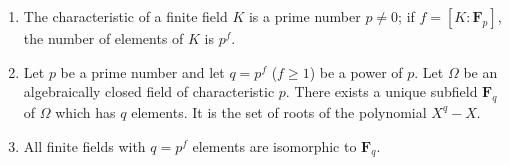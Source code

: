 \begin{enumerate}
\item[(i)] The characteristic of a finite field $K$ is a prime number $p \neq 0$; if $f = [K : \mathbf{F}_p]$, the number of elements of $K$ is $p^f$.
\item[(ii)] Let $p$ be a prime number and let $q = p^f$ ($f \geq 1$) be a power of $p$. Let $\Omega$ be an algebraically closed field of characteristic $p$. There exists a unique subfield $\mathbf{F}_q$ of $\Omega$ which has $q$ elements. It is the set of roots of the polynomial $X^q - X$.
\item[(iii)] All finite fields with $q = p^f$ elements are isomorphic to $\mathbf{F}_q$.
\end{enumerate}
